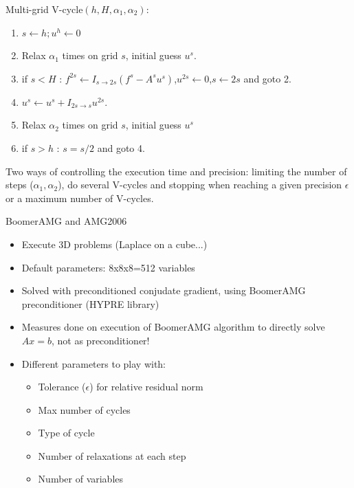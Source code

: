 \documentclass{beamer}
\begin{document}
\begin{frame}{Multi-grid}
  V-cycle$(h,H,\alpha_1,\alpha_2)$:\\
  \begin{enumerate}
    \item $s \leftarrow h; u^h\leftarrow0$
   \item Relax $\alpha_1$ times on grid $s$, initial guess $u^s$.
   \item if $s<H$ : $f^{2s} \leftarrow I_{s\rightarrow 2s}(f^s-A^su^s)$,$u^{2s}\leftarrow0$,$s \leftarrow 2s$ and goto 2.
   \item $u^s \leftarrow u^s+I_{2s\rightarrow s} u^{2s}$.
   \item Relax $\alpha_2$ times on grid $s$, initial guess $u^s$
   \item if $s > h$ : $s = s/2$ and goto 4.
  \end{enumerate}

  Two ways of controlling the execution time and precision: limiting the number of steps ($\alpha_1,\alpha_2$), do several V-cycles and stopping when reaching a given precision $\epsilon$ or a maximum number of V-cycles.
  
\end{frame}

\begin{frame}{BoomerAMG and AMG2006}
  
  \begin{itemize}
   \item Execute 3D problems (Laplace on a cube...)
   \item Default parameters: 8x8x8=512 variables
   \item Solved with preconditioned conjudate gradient, using BoomerAMG preconditioner (HYPRE library)
   \pause
   \item Measures done on execution of BoomerAMG algorithm to directly solve $Ax=b$, not as preconditioner!
   \item Different parameters to play with:
    \begin{itemize}
      \item Tolerance ($\epsilon$) for relative residual norm
      \item Max number of cycles
      \item Type of cycle
      \item Number of relaxations at each step
      \item Number of variables
    \end{itemize}
    
  \end{itemize}
 
\end{frame}
\end{document}
